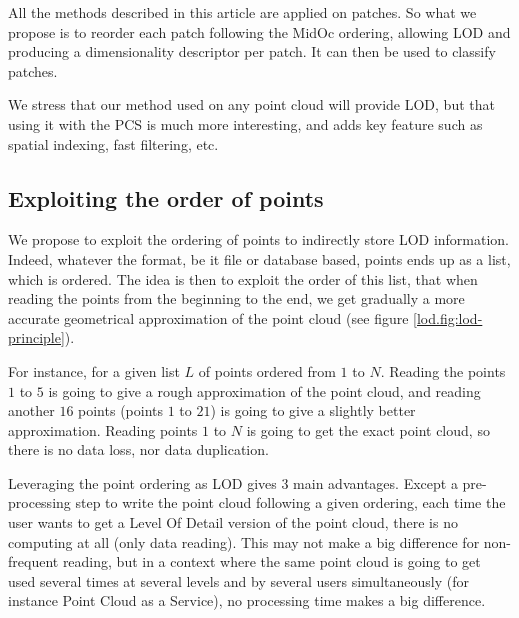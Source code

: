 		All the methods described in this article are applied on patches.
		So what we propose is to reorder each patch following the MidOc ordering, allowing LOD and producing a dimensionality descriptor per patch. It can then be used to classify patches.
		
		We stress that our method used on any point cloud will provide LOD,
		but that using it with the PCS is much more interesting,
		and adds key feature such as spatial indexing, fast filtering, etc. 
 
 	 
	 	 
	\subsection{Exploiting the order of points}
		\label{lod.method.order}
			
			
			We propose to exploit the ordering of points to indirectly store LOD information.
			Indeed, whatever the format, be it file or database based, points ends up as a list, which is ordered. 
			The idea is then to exploit the order of this list, 
			that when reading the points from the beginning to the end, we get gradually a more accurate geometrical approximation of the point cloud (see figure \ref{lod.fig:lod-principle}). 
			 
			For instance, for a given list $L$ of points ordered from $1$ to $N$.
			Reading the points $1$ to $5$ is going to give a rough approximation of the point cloud, and reading another $16$ points (points $1$ to $21$) is going to give a slightly better approximation. Reading points $1$ to $N$ is going to get the exact point cloud, so there is no data loss, nor data duplication.
		 
			Leveraging the point ordering as LOD gives 3 main advantages.
			Except a pre-processing step to write the point cloud following a given ordering, each time the user wants to get a Level Of Detail version of the point cloud, there is no computing at all (only data reading).
			This may not make a big difference for non-frequent reading, but in a context where the same point cloud is going to get used several times at several levels and by several users simultaneously (for instance Point Cloud as a Service), no processing time makes a big difference.
		
